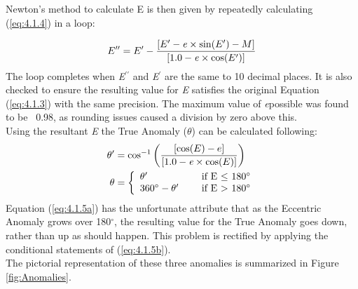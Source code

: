 \documentclass[12pt,preprint]{aastex}
\begin{document}
Newton's method to calculate E is then given by repeatedly calculating (\ref{eq:4.1.4}) in a loop:
  
\begin{equation}\label{eq:4.1.4}
E^{\prime \prime} = E^{\prime} - \frac{[E^{\prime} - {\it e} \times \sin(E^{\prime}) - M]}{[1.0 - {\it e} \times \cos(E^{\prime})]}
\end{equation}
The loop completes when {\it E$^{\prime \prime}$} and {\it E$^{\prime}$} are the same to 10 decimal places.  It is also checked to ensure the resulting value for {\it E} satisfies the original Equation (\ref{eq:4.1.3}) with the same precision.  The maximum value of {\it e}possible was found to be ~0.98, as rounding issues caused a division by zero above this.\\

Using the resultant {\it E} the True Anomaly ($\theta$) can be calculated following:
\begin{subequations}
\begin{align}
\label{eq:4.1.5a}
\theta^{\prime}& = \cos^{-1} \bigg( \frac{[\cos(E) - e]}{[1.0 -{\it e}\times \cos(E)]} \bigg)\\
\label{eq:4.1.5b}
\theta& = \left\{ \begin{array}{l l} \theta^{\prime}& \quad \text{ if E $\leq$ 180$^{\circ}$}\\ 360^{\circ}  - \theta^{\prime}& \quad \text{ if E $>$ 180$^{\circ}$} \end{array}\right.
\end{align}
\end{subequations}
Equation (\ref{eq:4.1.5a}) has the unfortunate attribute that as the Eccentric Anomaly grows over 180$^{\circ}$, the resulting value for the True Anomaly goes down, rather than up as should happen.  This problem is rectified by applying the conditional statements of (\ref{eq:4.1.5b}).\\  

The pictorial representation of these three anomalies is summarized in Figure \ref{fig:Anomalies}.
\end{document}
